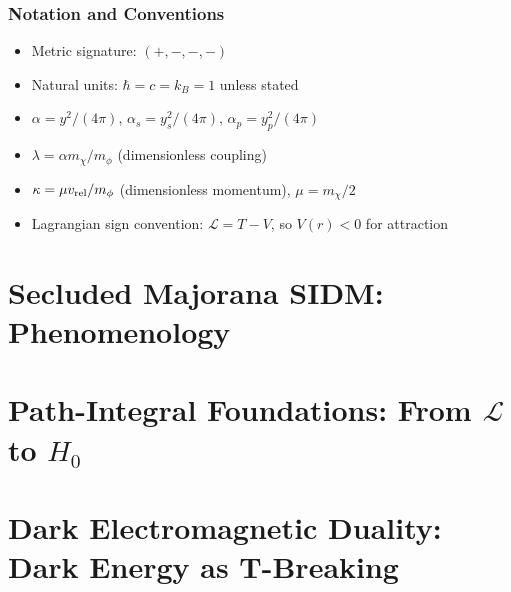 \documentclass[12pt,a4paper]{article}
\newcommand{\Lc}{\mathcal{L}}
\newcommand{\alphass}{\alpha_s}
\newcommand{\alphapp}{\alpha_p}
\begin{document}
\tableofcontents
\newpage

\section*{Notation and Conventions}

\begin{itemize}
  \item Metric signature: $(+,-,-,-)$
  \item Natural units: $\hbar = c = k_B = 1$ unless stated
  \item $\alpha = y^2/(4\pi)$, $\alphass = y_s^2/(4\pi)$, $\alphapp = y_p^2/(4\pi)$
  \item $\lambda = \alpha m_\chi / m_\phi$ (dimensionless coupling)
  \item $\kappa = \mu v_{\rm rel}/m_\phi$ (dimensionless momentum), $\mu = m_\chi/2$
  \item Lagrangian sign convention: $\Lc = T - V$, so $V(r) < 0$ for attraction
\end{itemize}

\newpage
\part{Secluded Majorana SIDM: Phenomenology}
\label{part:sidm}



\part{Path-Integral Foundations: From $\mathcal{L}$ to $H_0$}
\label{part:pathintegral}



\part{Dark Electromagnetic Duality: Dark Energy as T-Breaking}
\label{part:duality}
\end{document}
